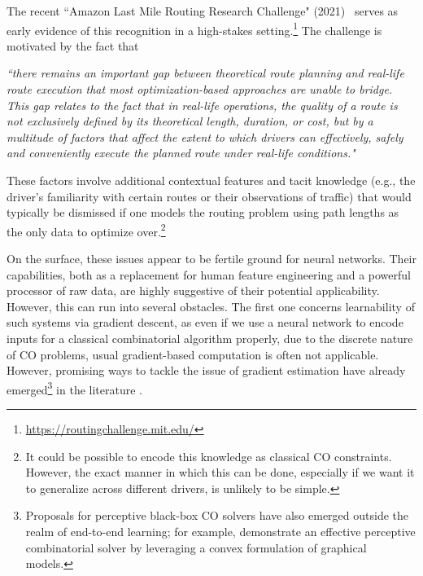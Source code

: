 \documentclass[twoside,11pt]{article}
\newcommand{\cm}[1]{{{\textcolor{orange}{\textbf{[CM:} {#1}\textbf{]}}}}}
\begin{document}
The recent ``Amazon Last Mile Routing Research Challenge" (2021)~\citep{winkenbach2021technical} serves as early evidence of this recognition in a high-stakes setting.\footnote{\url{https://routingchallenge.mit.edu/}} The challenge is motivated by the fact that
\begin{displayquote}
\textit{``there remains an important gap between theoretical route planning and real-life route execution that most optimization-based approaches are unable to bridge. This gap relates to the fact that in real-life operations, the quality of a route is not exclusively defined by its theoretical length, duration, or cost, but by a multitude of factors that affect the extent to which drivers can effectively, safely and conveniently execute the planned route under real-life conditions."} 
\end{displayquote}
These factors involve additional contextual features and tacit knowledge (e.g., the driver's familiarity with certain routes or their observations of traffic) that would typically be dismissed if one models the routing problem using path lengths as the only data to optimize over.\footnote{It could be possible to encode this knowledge as classical CO constraints. However, the exact manner in which this can be done, especially if we want it to generalize across different drivers, is unlikely to be simple.}%

On the surface, these issues appear to be fertile ground for neural networks. Their capabilities, both as a replacement for human feature engineering and a powerful processor of raw data, are highly suggestive of their potential applicability. However, this can run into several obstacles. The first one concerns learnability of such systems via gradient descent, as even if we use a neural network to encode inputs for a classical combinatorial algorithm properly, due to the discrete nature of CO problems, usual gradient-based computation is often not applicable. However, promising ways to tackle the issue of gradient estimation have already emerged\footnote{Proposals for perceptive black-box CO solvers have also emerged outside the realm of end-to-end learning; for example, \citet{brouard2020pushing} demonstrate an effective perceptive combinatorial solver by leveraging a convex formulation of graphical models.} in the literature \citep{knobelreiter2017end,wang2019satnet,vlastelica2019differentiation,mandi2020interior,niepert2021implicit}.
\end{document}
